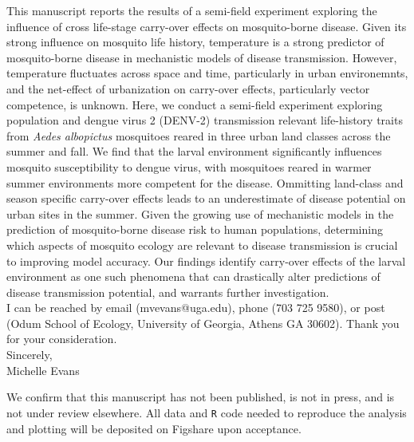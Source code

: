 \documentclass{letter}
\begin{document}
\begin{letter}
This manuscript reports the results of a semi-field experiment exploring the influence of cross life-stage carry-over effects on mosquito-borne disease. Given its strong influence on mosquito life history, temperature is a strong predictor of mosquito-borne disease in mechanistic models of disease transmission. However, temperature fluctuates across space and time, particularly in urban environemnts, and the net-effect of urbanization on carry-over effects, particularly vector competence, is unknown. Here, we conduct a semi-field experiment exploring population and dengue virus 2 (DENV-2) transmission relevant life-history traits from \textit{Aedes albopictus} mosquitoes reared in three urban land classes across the summer and fall. We find that the larval environment significantly influences mosquito susceptibility to dengue virus, with mosquitoes reared in warmer summer environments more competent for the disease. Ommitting land-class and season specific carry-over effects leads to an underestimate of disease potential on urban sites in the summer. Given the growing use of mechanistic models in the prediction of mosquito-borne disease risk to human populations, determining which aspects of mosquito ecology are relevant to disease transmission is crucial to improving model accuracy. Our findings identify carry-over effects of the larval environment as one such phenomena that can drastically alter predictions of disease transmission potential, and warrants further investigation. \\

I can be reached by email (mvevans@uga.edu), phone (703 725 9580), or post (Odum School of Ecology, University of Georgia, Athens GA 30602). Thank you for your consideration. \\

Sincerely,\\
Michelle Evans

\vspace{1cm}

\footnotesize
We confirm that this manuscript has not been published, is not in press, and is not under review elsewhere. All data and \texttt{R} code needed to reproduce the analysis and plotting will be deposited on Figshare upon acceptance.



\end{letter}
\end{document}
